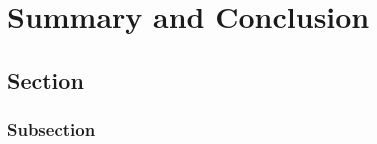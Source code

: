 
\chapter{Summary and Conclusion}\label{chapter:summary_and_conclusion}

\section{Section}

\subsection{Subsection}